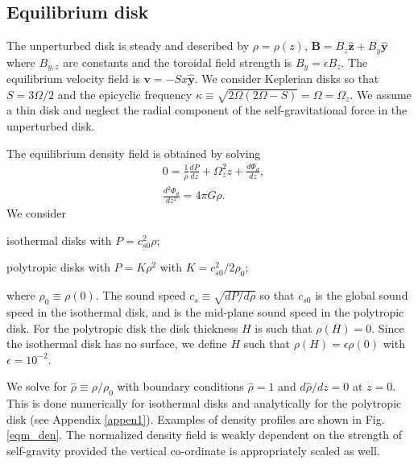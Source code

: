 
\subsection{Equilibrium disk} 
The unperturbed disk is steady and described by
$\rho=\rho(z)$, $\bm{B} = B_z\hat{\bm{z}} + B_y\hat{\bm{y}}$ where
$B_{y,z}$ are constants and the toroidal field strength is
$B_y=\epsilon B_z$. The equilibrium 
velocity field is $\bm{v} = -Sx\hat{\bm{y}}$. We consider Keplerian
disks so that $S = 3\Omega/2$ and the epicyclic frequency 
$\kappa\equiv\sqrt{2\Omega(2\Omega-S)}=\Omega=\Omega_z$. 
We assume a thin disk and neglect the radial component of the
self-gravitational force in 
the unperturbed disk.    

The equilibrium density field is obtained by solving
\begin{align}
  &0=\frac{1}{\rho}\frac{d P}{dz} + \Omega_z^2z + \frac{d\Phi_d}{dz},\label{eqm_eqns1}\\
  &\frac{d^2\Phi_d}{dz^2} = 4\pi G \rho.\label{eqm_eqns2}
\end{align}
We consider \begin{inparaenum}[(i)]
\item isothermal disks with $P=c_{s0}^2\rho$\label{iso_eos}; 
\item polytropic disks with $P=K\rho^2$ with $K=c_{s0}^2/2\rho_0$;
\end{inparaenum}
where $\rho_0\equiv\rho(0)$. The sound speed $c_s\equiv\sqrt{dP/d\rho}$
so that $c_{s0}$ is the global sound speed in the isothermal disk, and
is the mid-plane sound speed in the polytropic disk. For the polytropic
disk the disk thickness $H$ is such that $\rho(H)=0$. Since the
isothermal disk has no surface, we define $H$ such that
$\rho(H)=\epsilon\rho(0)$ with $\epsilon=10^{-2}$.   


We solve for $\hat{\rho}\equiv\rho/\rho_0$ with 
boundary conditions $\hat{\rho}=1$ and $d\hat{\rho}/dz=0$  at $z=0$. This
is done numerically for isothermal disks and analytically for the
polytropic disk (see Appendix \ref{appen1}). Examples of density
profiles are shown in Fig. \ref{eqm_den}. The normalized density field
is weakly dependent on the strength of self-gravity provided the
vertical co-ordinate is appropriately scaled as well.  

